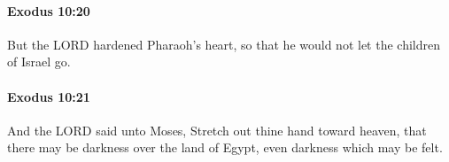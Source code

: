 		\paragraph{Exodus 10:20} %
			\label{EXODUS-10-20}

			But the LORD hardened Pharaoh's heart, so that he would not let the children of Israel go.


		\paragraph{Exodus 10:21} %
			\label{EXODUS-10-21}

			And the LORD said unto Moses, Stretch out thine hand toward heaven, that there may be darkness over the land of Egypt, even darkness which may be felt.


